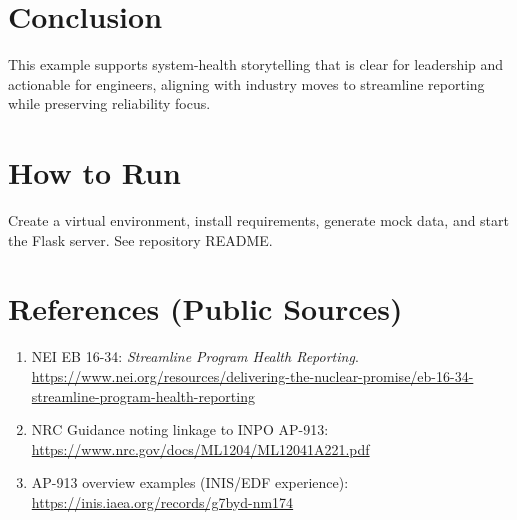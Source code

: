 \documentclass[11pt]{article}
\begin{document}
\section{Conclusion}
This example supports system-health storytelling that is clear for leadership and actionable for engineers, aligning with industry moves to streamline reporting while preserving reliability focus.

\appendix
\section{How to Run}
Create a virtual environment, install requirements, generate mock data, and start the Flask server. See repository README.

\section{References (Public Sources)}
\begin{enumerate}
\item NEI EB 16-34: \emph{Streamline Program Health Reporting}. \url{https://www.nei.org/resources/delivering-the-nuclear-promise/eb-16-34-streamline-program-health-reporting}
\item NRC Guidance noting linkage to INPO AP-913: \url{https://www.nrc.gov/docs/ML1204/ML12041A221.pdf}
\item AP-913 overview examples (INIS/EDF experience): \url{https://inis.iaea.org/records/g7byd-nm174}
\end{enumerate}
\end{document}
